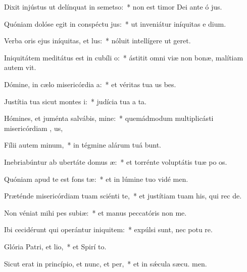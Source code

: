 \item Dixit injústus ut delínquat in semetso:~* non est timor Dei ante ó jus.
\item Quóniam dolóse egit in conspéctu jus:~* ut inveniátur iníquitas e  dium.
\item Verba oris ejus iníquitas, et lus:~* nóluit intellígere ut  geret.
\item Iniquitátem meditátus est in cubíli o:~* ástitit omni viæ non bonæ, malítiam autem  vit.
\item Dómine, in cælo misericórdia a:~* et véritas tua us  bes.
\item Justítia tua sicut montes i:~* judícia tua a ta.
\item Hómines, et juménta salvábis, mine:~* quemádmodum multiplicásti misericórdiam , us,
\item Fílii autem minum,~* in tégmine alárum tuá bunt.
\item Inebriabúntur ab ubertáte domus æ:~* et torrénte voluptátis tuæ po os.
\item Quóniam apud te est fons tæ:~* et in lúmine tuo vidé men.
\item Præténde misericórdiam tuam sciénti te,~* et justítiam tuam his, qui rec  de.
\item Non véniat mihi pes subiæ:~* et manus peccatóris non  me.
\item Ibi cecidérunt qui operántur iniquitem:~* expúlsi sunt, nec potu re.
\item Glória Patri, et lio,~* et Spirí to.
\item Sicut erat in princípio, et nunc, et per,~* et in sǽcula sæcu. men.
